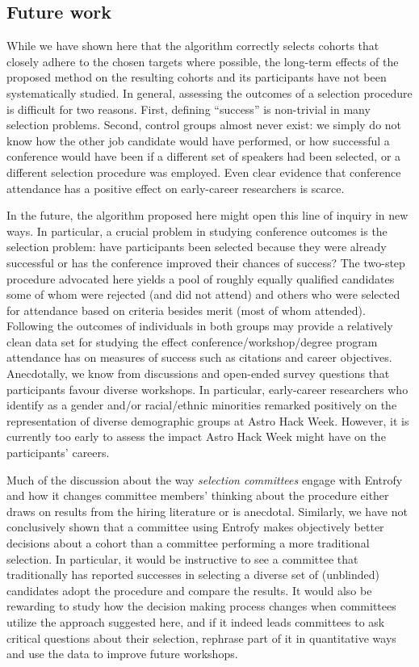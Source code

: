 \documentclass[12pt]{article}
\begin{document}
\subsection*{Future work}
\begin{bf}
While we have shown here that the algorithm correctly selects cohorts that closely adhere to the chosen targets where possible, the long-term effects of the proposed method on the resulting cohorts and its participants have not been systematically studied.
In general, assessing the outcomes of a selection procedure is difficult for two reasons.
First, defining ``success'' is non-trivial in many selection problems.
Second, control groups almost never exist: we simply do not know how the other job candidate would have performed, or how successful a conference would have been if a different set of speakers had been selected, or a different selection procedure was employed.
Even clear evidence that conference attendance has a positive effect on early-career researchers is scarce.

In the future, the algorithm proposed here might open this line of inquiry in new ways.
In particular, a crucial problem in studying conference outcomes is the selection problem: have participants been selected because they were already successful or has the conference improved their chances of success?
The two-step procedure advocated here yields a pool of roughly equally qualified candidates some of whom were rejected (and did not attend) and others who were selected for attendance based on criteria besides merit (most of whom attended).
Following the outcomes of individuals in both groups may provide a relatively clean data set for studying the effect conference/workshop/degree program attendance has on measures of success such as citations and career objectives. 
Anecdotally, we know from discussions and open-ended survey questions that participants favour diverse workshops.
In particular, early-career researchers who identify as a gender and/or racial/ethnic minorities remarked positively on the representation of diverse demographic groups at Astro Hack Week.
However, it is currently too early to assess the impact Astro Hack Week might have on the participants' careers. 

Much of the discussion about the way \textit{selection committees} engage with Entrofy and how it changes committee members' thinking about the procedure  either draws on results from the hiring literature or is anecdotal.
Similarly, we have not conclusively shown that a committee using Entrofy makes objectively better decisions about a cohort than a committee performing a more traditional selection.  
In particular, it would be instructive to see a committee that traditionally has reported successes in selecting a diverse set of (unblinded) candidates adopt the procedure and compare the results.
It would also be rewarding to study how the decision making process changes when committees utilize the approach suggested here, and if it indeed leads committees to ask critical questions about their selection, rephrase part of it in quantitative ways and use the data to improve future workshops.


\end{bf}
\end{document}
